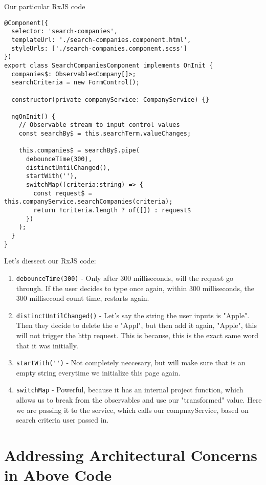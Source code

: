 Our particular RxJS code 
\begin{lstlisting}[caption=search-companies.compoennt.ts]
@Component({
  selector: 'search-companies',
  templateUrl: './search-companies.component.html',
  styleUrls: ['./search-companies.component.scss']
})
export class SearchCompaniesComponent implements OnInit {
  companies$: Observable<Company[]>;
  searchCriteria = new FormControl();

  constructor(private companyService: CompanyService) {}

  ngOnInit() {
    // Observable stream to input control values
    const searchBy$ = this.searchTerm.valueChanges;
    
    this.companies$ = searchBy$.pipe(
      debounceTime(300),
      distinctUntilChanged(),
      startWith(''),      
      switchMap((criteria:string) => {
        const request$ = this.companyService.searchCompanies(criteria);
        return !criteria.length ? of([]) : request$          
      })
    );
  }
}  
\end{lstlisting}

Let's diessect our RxJS code: 
\begin{enumerate}
  \item \lstinline{debounceTime(300)} - Only after 300 milliseconds, will the request go through. If the user decides to type once again, within 300 milliseconds, the 300 millisecond count time, restarts again. 
  \item \lstinline{distinctUntilChanged()} - Let's say the string the user inputs is "Apple". Then they decide to delete the e "Appl", but then add it again, "Apple", this will not trigger the http request. This is because, this is the exact same word that it was initially. 
  \item \lstinline{startWith('')} - Not completely neccesary, but will make sure that is an empty string everytime we initialize this page again. 
  \item \lstinline{switchMap} - Powerful, because it has an internal project function, which allows us to break from the observables and use our "transformed" value. Here we are passing it to the service, which calls our compnayService, based on search criteria user passed in. 
\end{enumerate}

\section{Addressing Architectural Concerns in Above Code}
